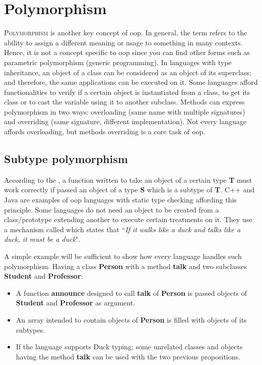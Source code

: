 \documentclass{KodeBook}
\begin{document}
\fi

\chapter{Polymorphism}

\begin{introduction}
	\lettrine{P}{olymorphism} is another key concept of \ac{oop}. 
	In general, the term refers to the ability to assign a different meaning or usage to something in many contexts.
	Hence, it is not a concept specific to \ac{oop} since you can find other forms such as parametric polymorphism (generic programming). 
	In languages with type inheritance, an object of a class can be considered as an object of its superclass; and therefore, the same applications can be executed on it.
	Some languages afford functionalities to verify if a certain object is instantiated from a class, to get its class or to cast the variable using it to another subclass.
	Methods can express polymorphism in two ways: overloading (same name with multiple signatures) and overriding (same signature, different implementation). 
	Not every language affords overloading, but methods overriding is a core task of \ac{oop}.
\end{introduction} 

\section{Subtype polymorphism}

According to the  \citep{1987-liskov}, a function written to take an object of a certain type \textbf{T} must work correctly if passed an object of a type \textbf{S} which is a subtype of \textbf{T}.
C++ and Java are examples of \ac{oop} languages with static type checking affording this principle. 
Some languages do not need an object to be created from a class/prototype extending another to execute certain treatments on it. 
They use a mechanism called  which states that ``\textit{If it walks like a duck and talks like a duck, it must be a duck}". 

A simple example will be sufficient to show how every language handles such polymorphism. 
Having a class \textbf{Person} with a method \textbf{talk} and two subclasses \textbf{Student} and \textbf{Professor}:
\begin{itemize}
	\item A function \textbf{announce} designed to call \textbf{talk} of \textbf{Person} is passed objects of \textbf{Student} and \textbf{Professor} as argument.
	\item An array intended to contain objects of \textbf{Person} is filled with objects of its subtypes.
	\item If the language supports Duck typing: some unrelated classes and objects having the method \textbf{talk} can be used with the two previous propositions.
\end{itemize}
\end{document}
